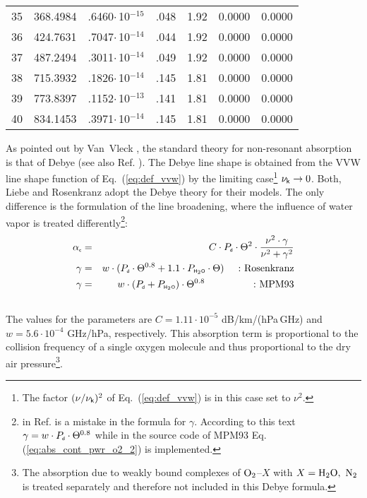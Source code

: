 {\begin{longtable}{|l||r|r|r|r|r|r|}
35 & 368.4984 & .6460$\cdot$\,10$^{-15}$ & .048 & 1.92 & 0.0000 & 0.0000 \\
36 & 424.7631 & .7047$\cdot$\,10$^{-14}$ & .044 & 1.92 & 0.0000 & 0.0000 \\
37 & 487.2494 & .3011$\cdot$\,10$^{-14}$ & .049 & 1.92 & 0.0000 & 0.0000 \\
38 & 715.3932 & .1826$\cdot$\,10$^{-14}$ & .145 & 1.81 & 0.0000 & 0.0000 \\
39 & 773.8397 & .1152$\cdot$\,10$^{-13}$ & .141 & 1.81 & 0.0000 & 0.0000 \\
40 & 834.1453 &  .3971$\cdot$\,10$^{-14}$ & .145 & 1.81 & 0.0000 & 0.0000 \\
\hline
\end{longtable}




\label{levele:02_pwr98_cont}
As pointed out by Van~Vleck \cite{vv:87}, the standard theory for
non-resonant absorption is that of Debye (see also Ref. \cite{townes:55}). 
The Debye line shape is obtained from the VVW line shape function of 
Eq.~(\ref{eq:def_vvw}) by the limiting case\footnote{The factor 
  $(\nu/\nu_{\sf k})^2$ of Eq.~(\ref{eq:def_vvw}) is in this case set to $\nu^2$.}
$\nu_{\sf k} \rightarrow 0$.
Both, Liebe \cite{liebeetal:93} and Rosenkranz \cite{pwr:93} adopt the
Debye theory for their models. The only difference is the formulation
of the line broadening, where the influence of water vapor is treated 
differently\footnote{in Ref. \cite{liebeetal:93} is a mistake in the formula
  for $\gamma$. According to this text $\gamma =
  w\cdot P_{\mbox{\tiny \sf d}}\cdot\Theta^{0.8}$ while in the source code of MPM93 
  Eq. (\ref{eq:abs_cont_pwr_o2_2}) is implemented.}: 
\begin{eqnarray}
  \label{eq:abs_cont_pwr_o2}
  \alphac &=&  C \cdot \pda \cdot \Theta^2 \cdot 
             \frac{\nu^2 \cdot \gamma}{\nu^2+\gamma^2}\\
%
  \label{eq:abs_cont_pwr_o2_1}
  \gamma &=&  w \cdot (\pda \cdot \Theta^{0.8} + 1.1 \cdot \phzo \cdot
  \Theta)\hspace*{5mm}\mbox{:~Rosenkranz}\\
  \label{eq:abs_cont_pwr_o2_2}
  \gamma &=&  w \cdot (\pda + \phzo) \cdot \Theta^{0.8}\hspace*{17.25mm}\mbox{:~MPM93}\\
\nonumber
\end{eqnarray}
The values for the parameters are $C = 1.11\cdot 10^{-5}$ dB/km/(hPa\,GHz) and 
$w = 5.6 \cdot 10^{-4}$ GHz/hPa, respectively. This absorption
term is proportional to the collision frequency of a single oxygen molecule
and thus proportional to the dry air pressure\footnote{The absorption
  due to weakly bound complexes of $\mbox{O}_2$--$X$ with $X=\mbox{H}_2\mbox{O},~\mbox{N}_2$ is 
  treated separately and therefore not included in this Debye
  formula.}.

}
